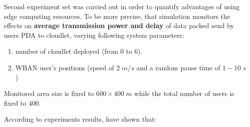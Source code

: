 \documentclass[sigchi]{acmart}
\begin{document}
Second experiment set was carried out in order to quantify advantages of using edge computing resources. To be more precise, that simulation monitors the effects on \textbf{average transmission power and delay} of data packed send by users PDA to cloudlet, varying following system parameters:

\begin{enumerate}
\item number of cloudlet deployed (from 0 to 6).
\item WBAN user's positions (speed of $2\;m/s$ and a random pause time of $1-10\;s$)
\end{enumerate}

Monitored area size is fixed to $600 \times 400\;m$ while the total number of users is fixed to $400$.

According to experiments results, \cite{MSAReport} have shown that:
\end{document}
